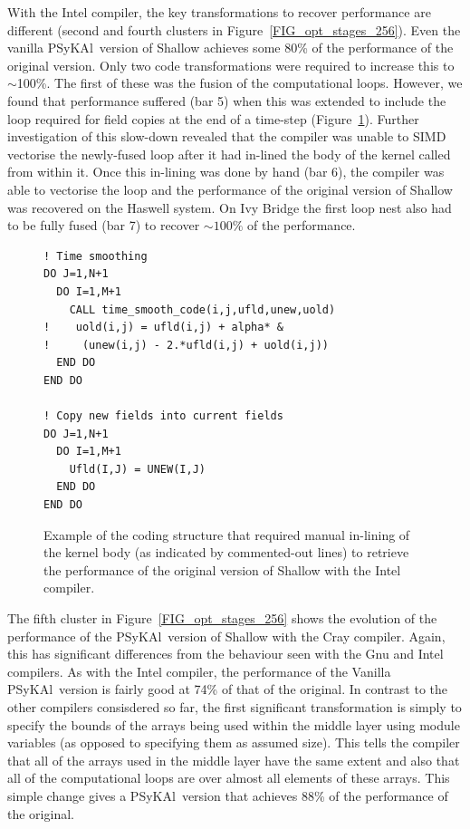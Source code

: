 \documentclass{IOS-Book-Article}
\newcommand{\psykal}{{PS}y{KA}l\ }
\begin{document}
With the Intel compiler, the key transformations to recover
performance are different (second and fourth clusters in
Figure~\ref{FIG_opt_stages_256}).  Even the vanilla \psykal version of
Shallow achieves some 80\% of the performance of the original
version. Only two code transformations were required to increase this
to $\sim$100\%. The first of these was the fusion of the computational
loops. However, we found that performance suffered (bar 5) when this
was extended to include the loop required for field copies at the end
of a time-step (Figure~\ref{FIG_time_smooth_code}). Further
investigation of this slow-down revealed that the compiler was unable
to SIMD vectorise the newly-fused loop after it had in-lined the body
of the kernel called from within it. Once this in-lining was done by
hand (bar 6), the compiler was able to vectorise the loop and the
performance of the original version of Shallow was recovered on the
Haswell system. On Ivy Bridge the first loop nest also had to be fully
fused (bar 7) to recover $\sim100\%$ of the performance.

\begin{figure}
\begin{verbatim}
! Time smoothing
DO J=1,N+1
  DO I=1,M+1
    CALL time_smooth_code(i,j,ufld,unew,uold)
!    uold(i,j) = ufld(i,j) + alpha* &
!     (unew(i,j) - 2.*ufld(i,j) + uold(i,j))
  END DO
END DO

! Copy new fields into current fields
DO J=1,N+1
  DO I=1,M+1
    Ufld(I,J) = UNEW(I,J)
  END DO
END DO
\end{verbatim}
\caption{Example of the coding structure that required manual
  in-lining of the kernel body (as indicated by commented-out lines)
  to retrieve the performance of the original version of Shallow with
  the Intel compiler.}
\label{FIG_time_smooth_code}
\end{figure}

The fifth cluster in Figure~\ref{FIG_opt_stages_256} shows the
evolution of the performance of the \psykal version of Shallow with
the Cray compiler. Again, this has significant differences from the
behaviour seen with the Gnu and Intel compilers. As with the Intel
compiler, the performance of the Vanilla \psykal version is fairly
good at 74\% of that of the original. In contrast to the other
compilers consisdered so far, the first significant transformation is
simply to specify the bounds of the arrays being used within the
middle layer using module variables (as opposed to specifying them as
assumed size). This tells the compiler that all of the arrays used in
the middle layer have the same extent and also that all of the
computational loops are over almost all elements of these arrays. This
simple change gives a \psykal version that achieves 88\% of the
performance of the original.
\end{document}
